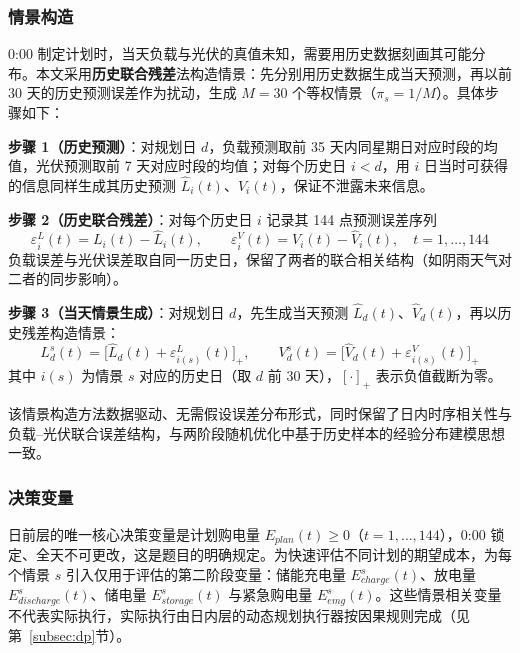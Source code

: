 \documentclass[zihao=-4,a4paper,UTF8,fontset=none]{ctexart}
\begin{document}
\subsubsection{情景构造}

0:00 制定计划时，当天负载与光伏的真值未知，需要用历史数据刻画其可能分布。本文采用\textbf{历史联合残差}法构造情景：先分别用历史数据生成当天预测，再以前 30 天的历史预测误差作为扰动，生成 $M=30$ 个等权情景（$\pi_s=1/M$）。具体步骤如下：

\textbf{步骤 1（历史预测）}：对规划日 $d$，负载预测取前 35 天内同星期日对应时段的均值，光伏预测取前 7 天对应时段的均值；对每个历史日 $i<d$，用 $i$ 日当时可获得的信息同样生成其历史预测 $\hat{L}_i(t)$、$\hat{V}_i(t)$，保证不泄露未来信息。

\textbf{步骤 2（历史联合残差）}：对每个历史日 $i$ 记录其 144 点预测误差序列
\begin{equation}
  \varepsilon_i^{L}(t) = L_i(t) - \hat{L}_i(t),\qquad
  \varepsilon_i^{V}(t) = V_i(t) - \hat{V}_i(t),\quad t=1,\ldots,144
  \label{eq:residual}
\end{equation}
负载误差与光伏误差取自同一历史日，保留了两者的联合相关结构（如阴雨天气对二者的同步影响）。

\textbf{步骤 3（当天情景生成）}：对规划日 $d$，先生成当天预测 $\hat{L}_d(t)$、$\hat{V}_d(t)$，再以历史残差构造情景：
\begin{equation}
  L_d^{s}(t) = \big[\hat{L}_d(t) + \varepsilon_{i(s)}^{L}(t)\big]_{+},\qquad
  V_d^{s}(t) = \big[\hat{V}_d(t) + \varepsilon_{i(s)}^{V}(t)\big]_{+}
  \label{eq:scenario}
\end{equation}
其中 $i(s)$ 为情景 $s$ 对应的历史日（取 $d$ 前 30 天），$[\cdot]_{+}$ 表示负值截断为零。

该情景构造方法数据驱动、无需假设误差分布形式，同时保留了日内时序相关性与负载--光伏联合误差结构，与两阶段随机优化中基于历史样本的经验分布建模思想一致\cite{garciatorres2021stochastic}。

\subsubsection{决策变量}

日前层的唯一核心决策变量是计划购电量 $E_{plan}(t)\ge 0$（$t=1,\ldots,144$），0:00 锁定、全天不可更改，这是题目的明确规定。为快速评估不同计划的期望成本，为每个情景 $s$ 引入仅用于评估的第二阶段变量：储能充电量 $E_{charge}^{s}(t)$、放电量 $E_{discharge}^{s}(t)$、储电量 $E_{storage}^{s}(t)$ 与紧急购电量 $E_{emg}^{s}(t)$。这些情景相关变量不代表实际执行，实际执行由日内层的动态规划执行器按因果规则完成（见第~\ref{subsec:dp}节）。
\end{document}

